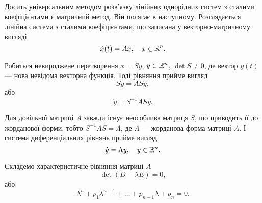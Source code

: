Досить універсальним методом розв’язку лінійних однорідних систем з сталими коефіцієнтами є матричний метод. Він полягає в наступному. Розглядається лінійна система з сталими коефіцієнтами, що записана у векторно-матричному вигляді
\begin{equation*}
	\dot x(t) = A x, \quad x \in \mathbb{R}^n.	
\end{equation*}

Робиться невироджене перетворення $x = S y$, $y \in \mathbb{R}^n$, $\det S \ne 0$, де вектор $y(t)$ --- нова невідома векторна функція. Тоді рівняння прийме вигляд
\begin{equation*}
	S \dot y = A S y,
\end{equation*}
або
\begin{equation*}
	\dot y = S^{-1} A S y.
\end{equation*}

Для довільної матриці $A$ завжди існує неособлива матриця $S$, що приводить її до жорданової форми, тобто $S^{-1} A S = \Lambda$, де $\Lambda$ --- жорданова форма матриці $A$. І система диференціальних рівнянь прийме вигляд
\begin{equation*}
	\dot y = \Lambda y, \quad y \in \mathbb{R}^n.
\end{equation*}

Складемо характеристичне рівняння матриці $A$
\begin{equation*}
	\det (D - \lambda E) = 0,
\end{equation*}
або
\begin{equation*}
	\lambda^n + p_1 \lambda^{n - 1} + \ldots + p_{n - 1} \lambda + p_n = 0.
\end{equation*}

